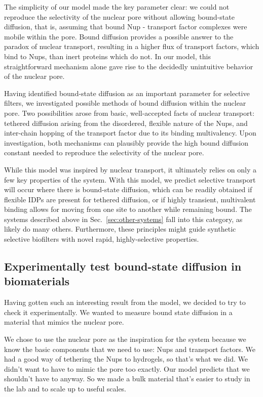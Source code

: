 The simplicity of our model made the key parameter clear: we could not reproduce the selectivity of the nuclear pore without allowing bound-state diffusion, that is, assuming that bound Nup - transport factor complexes were mobile within the pore.  Bound diffusion provides a possible answer to the paradox of nuclear transport, resulting in a higher flux of transport factors, which bind to Nups, than inert proteins which do not.  In our model, this straightforward mechanism alone gave rise to the decidedly unintuitive behavior of the nuclear pore.

Having identified bound-state diffusion as an important parameter for selective filters, we investigated possible methods of bound diffusion within the nuclear pore.  Two possibilities arose from basic, well-accepted facts of nuclear transport: tethered diffusion arising from the disordered, flexible nature of the Nups, and inter-chain hopping of the transport factor due to its binding multivalency.  Upon investigation, both mechanisms can plausibly provide the high bound diffusion constant needed to reproduce the selectivity of the nuclear pore.

While this model was inspired by nuclear transport, it ultimately relies on only a few key properties of the system.  With this model, we predict selective transport will occur where there is bound-state diffusion, which can be readily obtained if flexible IDPs are present for tethered diffusion, or if highly transient, multivalent binding allows for moving from one site to another while remaining bound.  The systems described above in Sec.~\ref{sec:other-systems} fall into this category, as likely do many others.  Furthermore, these principles might guide synthetic selective biofilters with novel rapid, highly-selective properties.

\subsection{Experimentally test bound-state diffusion in biomaterials}

Having gotten such an interesting result from the model, we decided to try to check it experimentally.  We wanted to measure bound state diffusion in a material that mimics the nuclear pore.  

We chose to use the nuclear pore as the inspiration for the system because we know the basic components that we need to use: Nups and transport factors.  We had a good way of tethering the Nups to hydrogels, so that's what we did.  We didn't want to have to mimic the pore too exactly. Our model predicts that we shouldn't have to anyway. So we made a bulk material that's easier to study in the lab and to scale up to useful scales.


